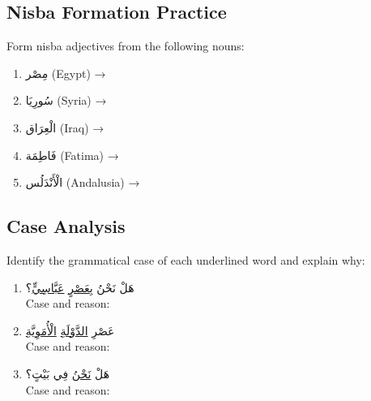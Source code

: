 \documentclass[letterpaper,12pt]{article}
\begin{document}
\subsection{Nisba Formation Practice}

Form nisba adjectives from the following nouns:

\begin{enumerate}
\item \textarabic{مِصْر} (Egypt) → \underline{\hspace{3cm}}

\item \textarabic{سُورِيَا} (Syria) → \underline{\hspace{3cm}}

\item \textarabic{الْعِرَاق} (Iraq) → \underline{\hspace{3cm}}

\item \textarabic{فَاطِمَة} (Fatima) → \underline{\hspace{3cm}}

\item \textarabic{الْأَنْدَلُس} (Andalusia) → \underline{\hspace{3cm}}
\end{enumerate}

\subsection{Case Analysis}

Identify the grammatical case of each underlined word and explain why:

\begin{enumerate}
\item \textarabic{هَلْ نَحْنُ بِ\underline{عَصْرٍ} \underline{عَبَّاسِيٍّ}؟}\\
Case and reason: \underline{\hspace{8cm}}

\item \textarabic{عَصْرِ \underline{الدَّوْلَةِ} \underline{الْأُمَوِيَّةِ}}\\
Case and reason: \underline{\hspace{8cm}}

\item \textarabic{هَلْ \underline{نَحْنُ} فِي بَيْتٍ؟}\\
Case and reason: \underline{\hspace{8cm}}
\end{enumerate}
\end{document}

